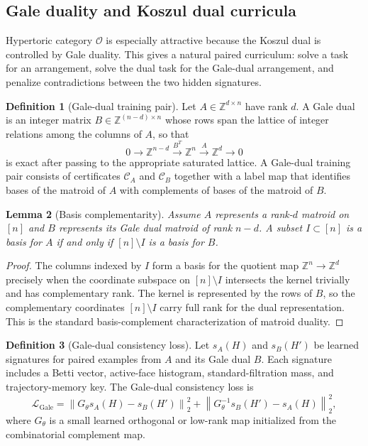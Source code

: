 \documentclass[11pt]{article}
\theoremstyle{definition}
\newtheorem{definition}{Definition}[section]
\theoremstyle{plain}
\newtheorem{lemma}[definition]{Lemma}
\theoremstyle{remark}
\numberwithin{equation}{section}
\newcommand{\Z}{\mathbb{Z}}
\newcommand{\norm}[1]{\left\lVert #1\right\rVert}
\begin{document}
\subsection{Gale duality and Koszul dual curricula}

Hypertoric category $\mathcal O$ is especially attractive because the Koszul dual is controlled by Gale duality.  This gives a natural paired curriculum: solve a task for an arrangement, solve the dual task for the Gale-dual arrangement, and penalize contradictions between the two hidden signatures.

\begin{definition}[Gale-dual training pair]\label{def:gale-pair}
Let $A\in\Z^{d\times n}$ have rank $d$.  A Gale dual is an integer matrix $B\in\Z^{(n-d)\times n}$ whose rows span the lattice of integer relations among the columns of $A$, so that
\begin{equation}
  0\longrightarrow \Z^{n-d}\xrightarrow{B^T}\Z^n\xrightarrow{A}\Z^d\longrightarrow 0
\end{equation}
is exact after passing to the appropriate saturated lattice.  A Gale-dual training pair consists of certificates $\mathcal C_A$ and $\mathcal C_B$ together with a label map that identifies bases of the matroid of $A$ with complements of bases of the matroid of $B$.
\end{definition}

\begin{lemma}[Basis complementarity]\label{lem:basis-complementarity}
Assume $A$ represents a rank-$d$ matroid on $[n]$ and $B$ represents its Gale dual matroid of rank $n-d$.  A subset $I\subset[n]$ is a basis for $A$ if and only if $[n]\setminus I$ is a basis for $B$.
\end{lemma}

\begin{proof}
The columns indexed by $I$ form a basis for the quotient map $\Z^n\to\Z^d$ precisely when the coordinate subspace on $[n]\setminus I$ intersects the kernel trivially and has complementary rank.  The kernel is represented by the rows of $B$, so the complementary coordinates $[n]\setminus I$ carry full rank for the dual representation.  This is the standard basis-complement characterization of matroid duality.
\end{proof}

\begin{definition}[Gale-dual consistency loss]\label{def:gale-loss}
Let $s_A(H)$ and $s_B(H')$ be learned signatures for paired examples from $A$ and its Gale dual $B$.  Each signature includes a Betti vector, active-face histogram, standard-filtration mass, and trajectory-memory key.  The Gale-dual consistency loss is
\begin{equation}
  \mathcal L_{\mathrm{Gale}}=\norm{G_\theta s_A(H)-s_B(H')}_2^2+\norm{G_\theta^{-1}s_B(H')-s_A(H)}_2^2,
\end{equation}
where $G_\theta$ is a small learned orthogonal or low-rank map initialized from the combinatorial complement map.
\end{definition}
\end{document}
